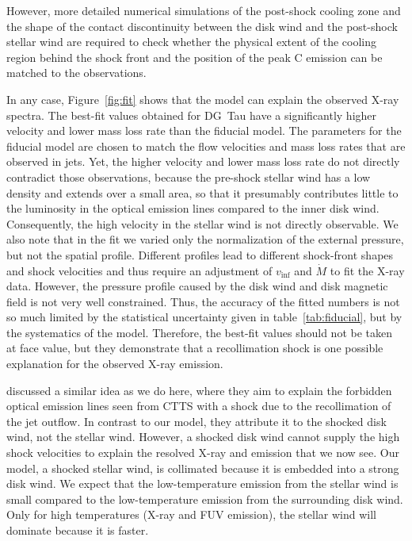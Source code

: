 However, more detailed numerical simulations of the post-shock cooling zone and the shape of the contact discontinuity between the disk wind and the post-shock stellar wind are required to check whether the physical extent of the cooling region behind the shock front and the position of the peak  C emission can be matched to the observations.

In any case, Figure~\ref{fig:fit} shows that the model can explain the observed X-ray spectra. The best-fit values obtained for DG~Tau have a significantly higher velocity and lower mass loss rate than the fiducial model. The parameters for the fiducial model are chosen to match the flow velocities and mass loss rates that are observed in jets. Yet, the higher velocity and lower mass loss rate do not directly contradict those observations, because the pre-shock stellar wind has a low density and extends over a small area, so that it presumably  contributes little to the luminosity in the optical emission lines compared to the inner disk wind. Consequently, the high velocity in the stellar wind is not directly observable. We also note that in the fit we varied only the normalization of the external pressure, but not the spatial profile. Different profiles lead to different shock-front shapes and shock velocities and thus require an adjustment of $v_\inf$ and $\dot M$ to fit the X-ray data. However, the pressure profile caused by the disk wind and disk magnetic field is not very well constrained. Thus, the accuracy of the fitted numbers is not so much limited by the statistical uncertainty given in table~\ref{tab:fiducial}, but by the systematics of the model. Therefore, the best-fit values should not be taken at face value, but they demonstrate that a recollimation shock is one possible explanation for the observed X-ray emission. 

\citet{1993ApJ...409..748G} discussed a similar idea as we do here, where they aim to explain the forbidden optical emission lines seen from CTTS with a shock due to the recollimation of the jet outflow. In contrast to our model, they attribute it to the shocked disk wind, not the stellar wind. However, a shocked disk wind cannot supply the high shock velocities to explain the resolved X-ray and  emission that we now see. Our model, a shocked stellar wind, is collimated because it is embedded into a strong disk wind. We expect that the low-temperature emission from the stellar wind is small compared to the low-temperature emission from the surrounding disk wind. Only for high temperatures (X-ray and FUV emission), the stellar wind will dominate because it is faster.

